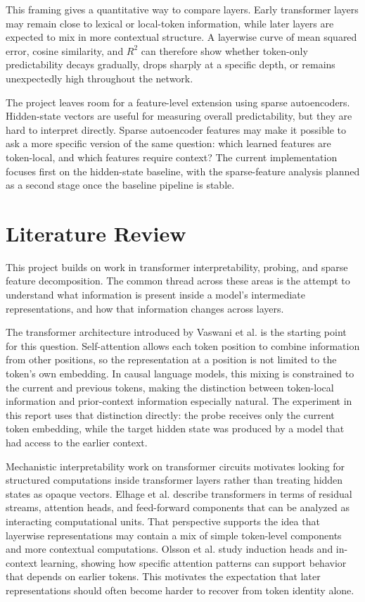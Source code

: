 \documentclass[10pt]{article}
\begin{document}
This framing gives a quantitative way to compare layers. Early transformer layers may remain close to lexical or local-token information, while later layers are expected to mix in more contextual structure. A layerwise curve of mean squared error, cosine similarity, and $R^2$ can therefore show whether token-only predictability decays gradually, drops sharply at a specific depth, or remains unexpectedly high throughout the network.

The project leaves room for a feature-level extension using sparse autoencoders. Hidden-state vectors are useful for measuring overall predictability, but they are hard to interpret directly. Sparse autoencoder features may make it possible to ask a more specific version of the same question: which learned features are token-local, and which features require context? The current implementation focuses first on the hidden-state baseline, with the sparse-feature analysis planned as a second stage once the baseline pipeline is stable.

\section{Literature Review}

This project builds on work in transformer interpretability, probing, and sparse feature decomposition. The common thread across these areas is the attempt to understand what information is present inside a model's intermediate representations, and how that information changes across layers.

The transformer architecture introduced by Vaswani et al. \cite{vaswani2017attention} is the starting point for this question. Self-attention allows each token position to combine information from other positions, so the representation at a position is not limited to the token's own embedding. In causal language models, this mixing is constrained to the current and previous tokens, making the distinction between token-local information and prior-context information especially natural. The experiment in this report uses that distinction directly: the probe receives only the current token embedding, while the target hidden state was produced by a model that had access to the earlier context.

Mechanistic interpretability work on transformer circuits motivates looking for structured computations inside transformer layers rather than treating hidden states as opaque vectors. Elhage et al. \cite{elhage2021framework} describe transformers in terms of residual streams, attention heads, and feed-forward components that can be analyzed as interacting computational units. That perspective supports the idea that layerwise representations may contain a mix of simple token-level components and more contextual computations. Olsson et al. \cite{olsson2022induction} study induction heads and in-context learning, showing how specific attention patterns can support behavior that depends on earlier tokens. This motivates the expectation that later representations should often become harder to recover from token identity alone.
\end{document}
